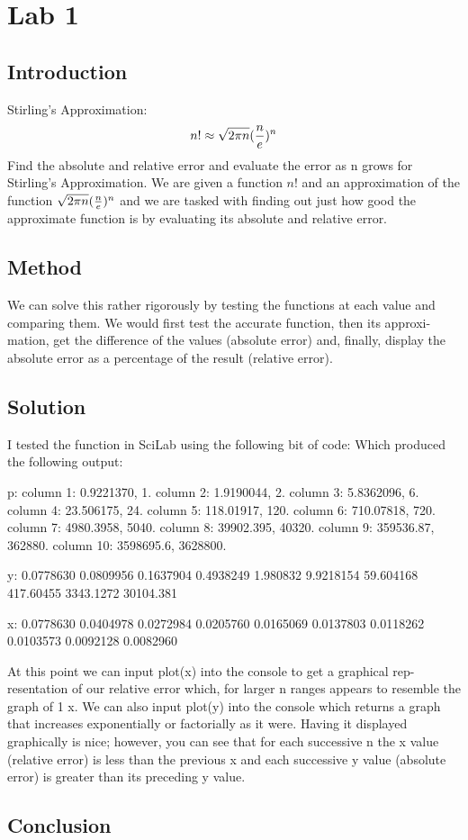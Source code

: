 \section{Lab 1}
\subsection{Introduction}
Stirling’s Approximation: 
\begin{equation}
n! \approx \sqrt{2\pi n} ({n \over e})^n
\end{equation}
Find the absolute and relative error and evaluate the error as n grows for Stirling’s Approximation. We are given a function $n!$ and an approximation of the function $\sqrt{2\pi n}({n\over e})^n$ and we are tasked with ﬁnding out just how good the approximate function is by evaluating its absolute and relative error.

\subsection{Method}
We can solve this rather rigorously by testing the functions at each value and comparing them. We would ﬁrst test the accurate function, then its approxi- mation, get the diﬀerence of the values (absolute error) and, ﬁnally, display the absolute error as a percentage of the result (relative error).
\subsection{Solution}
I tested the function in SciLab using the following bit of code:
Which produced the following output:

p: column 1: 0.9221370, 1. column 2: 1.9190044, 2. column 3: 5.8362096, 6. column 4: 23.506175, 24. column 5: 118.01917, 120. column 6: 710.07818, 720. column 7: 4980.3958, 5040. column 8: 39902.395, 40320. column 9: 359536.87, 362880. column 10: 3598695.6, 3628800.

y: 0.0778630 0.0809956 0.1637904 0.4938249 1.980832 9.9218154 59.604168 417.60455 3343.1272 30104.381

x: 0.0778630 0.0404978 0.0272984 0.0205760 0.0165069 0.0137803 0.0118262 0.0103573 0.0092128 0.0082960

At this point we can input plot(x) into the console to get a graphical rep- resentation of our relative error which, for larger n ranges appears to resemble the graph of 1 x. We can also input plot(y) into the console which returns a graph that increases exponentially or factorially as it were. Having it displayed graphically is nice; however, you can see that for each successive n the x value (relative error) is less than the previous x and each successive y value (absolute error) is greater than its preceding y value.


\subsection{Conclusion}
